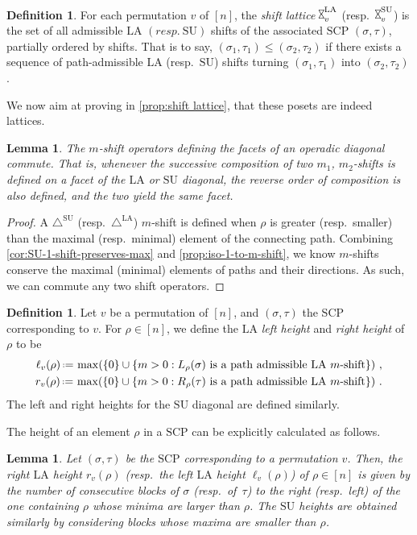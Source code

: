 \documentclass{amsart}
\newcommand{\darkblue}{\color{darkblue}} %
\newtheorem{lemma}[theorem]{Lemma}
\theoremstyle{definition}
\newtheorem{definition}[theorem]{Definition}
\newcommand{\eqdef}{\mbox{\,\raisebox{0.2ex}{\scriptsize\ensuremath{\mathrm:}}\ensuremath{=}\,}} %
\newcommand{\resp}{resp.~} %
\newcommand{\defn}[1]{\textsl{\darkblue #1}} %
\newcommand{\SU}{\mathrm{SU}}
\newcommand{\LA}{\mathrm{LA}}
\newcommand{\SUD}{\triangle^{\mathrm{SU}}}
\newcommand{\LAD}{\triangle^{\mathrm{LA}}}
\newcommand{\SCP}{\mathrm{SCP}}
\newcommand{\hour}{\raisebox{0.065cm}{\rotatebox[origin=c]{90}{$\bowtie$}}_v}
\begin{document}
\begin{definition}
\label{def:shift-lattice}
For each permutation $v$ of $[n]$, the \defn{shift lattice} $\hour^\LA$ (\resp $\hour^\SU$) is the set of all admissible $\LA$ $(\resp \SU)$ shifts of the associated $\SCP$ $(\sigma,\tau)$, partially ordered by shifts.
That is to say, $(\sigma_1,\tau_1)\leq (\sigma_2,\tau_2)$ if there exists a sequence of path-admissible $\LA$ (\resp $\SU$) shifts turning $(\sigma_1,\tau_1)$ into $(\sigma_2,\tau_2)$.
\end{definition}

We now aim at proving in \cref{prop:shift lattice}, that these posets are indeed lattices.

\begin{lemma}
\label{lem:m-shifts commute}
The $m$-shift operators defining the facets of an operadic diagonal commute. 
That is, whenever the successive composition of two $m_1$, $m_2$-shifts is defined on a facet of the $\LA$ or $\SU$ diagonal, the reverse order of composition is also defined, and the two yield the same facet. 
\end{lemma}
\begin{proof}
A $\SUD$ (\resp $\LAD$) $m$-shift is defined when $\rho$ is greater (\resp smaller) than the maximal (\resp minimal) element of the connecting path.
Combining \cref{cor:SU-1-shift-preserves-max} and \cref{prop:iso-1-to-m-shift}, we know $m$-shifts conserve the maximal (minimal) elements of paths and their directions.
As such, we can commute any two shift operators.
\end{proof}

\begin{definition}
Let $v$ be a permutation of $[n]$, and $(\sigma,\tau)$ the SCP corresponding to $v$.
For $\rho \in [n]$, we define the $\LA$ \defn{left height} and \defn{right height} of $\rho$ to be 
\begin{align*}
	\ell_v(\rho) \eqdef \max (\{0\}\cup \{m>0: L_{\rho}(\sigma) \text{ is a path admissible $\LA$ $m$-shift} \}) \ , \\
	r_v(\rho) \eqdef \max (\{0\}\cup \{m>0: R_{\rho}(\tau) \text{ is a path admissible $\LA$ $m$-shift} \}) \ .
\end{align*}
The left and right heights for the $\SU$ diagonal are defined similarly. 
\end{definition}

The height of an element $\rho$ in a $\SCP$ can be explicitly calculated as follows. 

\begin{lemma}
\label{prop:maximal m-shift formulae}
Let $(\sigma,\tau)$ be the $\SCP$ corresponding to a permutation $v$.
Then, the right $\LA$ height $r_v(\rho)$ (\resp the left $\LA$ height $\ell_v(\rho)$) of $\rho \in [n]$ is given by the number of consecutive blocks of $\sigma$ (\resp of~$\tau$) to the right (\resp left) of the one containing $\rho$ whose minima are larger than $\rho$.
The $\SU$ heights are obtained similarly by considering blocks whose maxima are smaller than $\rho$. 
\end{lemma}
\end{document}
